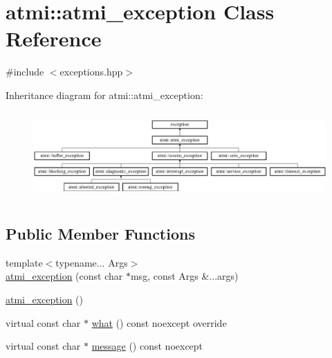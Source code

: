 \hypertarget{classatmi_1_1atmi__exception}{}\section{atmi\+:\+:atmi\+\_\+exception Class Reference}
\label{classatmi_1_1atmi__exception}


{\ttfamily \#include $<$exceptions.\+hpp$>$}

Inheritance diagram for atmi\+:\+:atmi\+\_\+exception\+:\begin{figure}[H]
\begin{center}
\leavevmode
\includegraphics[height=3.373494cm]{classatmi_1_1atmi__exception}
\end{center}
\end{figure}
\subsection*{Public Member Functions}
\begin{DoxyCompactItemize}
\item 
{\footnotesize template$<$typename... Args$>$ }\\\hyperlink{classatmi_1_1atmi__exception_a95882b5a28a14774110080a50601abd5}{atmi\+\_\+exception} (const char $\ast$msg, const Args \&...args)
\item 
\hyperlink{classatmi_1_1atmi__exception_afa30faf28ecbc27a8aeb06dccd3b1de6}{atmi\+\_\+exception} ()
\item 
virtual const char $\ast$ \hyperlink{classatmi_1_1atmi__exception_ac4f376d7dc01ce853fa3f3d2d407b3a3}{what} () const  noexcept override
\item 
virtual const char $\ast$ \hyperlink{classatmi_1_1atmi__exception_a4d457a0e0ced6177ce86a241691c8239}{message} () const  noexcept
\end{DoxyCompactItemize}
